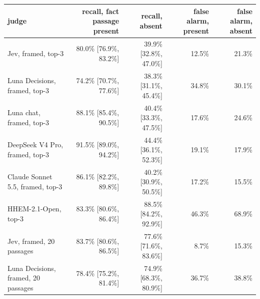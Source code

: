 \begin{tabular}{lrrrr}
\toprule
judge & recall, fact passage present & recall, absent & false alarm, present & false alarm, absent \\
\midrule
Jev, framed, top-3 & 80.0\% [76.9\%, 83.2\%] & 39.9\% [32.8\%, 47.0\%] & 12.5\% & 21.3\% \\
Luna Decisions, framed, top-3 & 74.2\% [70.7\%, 77.6\%] & 38.3\% [31.1\%, 45.4\%] & 34.8\% & 30.1\% \\
Luna chat, framed, top-3 & 88.1\% [85.4\%, 90.5\%] & 40.4\% [33.3\%, 47.5\%] & 17.6\% & 24.6\% \\
DeepSeek V4 Pro, framed, top-3 & 91.5\% [89.0\%, 94.2\%] & 44.4\% [36.1\%, 52.3\%] & 19.1\% & 17.9\% \\
Claude Sonnet 5.5, framed, top-3 & 86.1\% [82.2\%, 89.8\%] & 40.2\% [30.9\%, 50.5\%] & 17.2\% & 15.5\% \\
HHEM-2.1-Open, top-3 & 83.3\% [80.6\%, 86.4\%] & 88.5\% [84.2\%, 92.9\%] & 46.3\% & 68.9\% \\
Jev, framed, 20 passages & 83.7\% [80.6\%, 86.5\%] & 77.6\% [71.6\%, 83.6\%] & 8.7\% & 15.3\% \\
Luna Decisions, framed, 20 passages & 78.4\% [75.2\%, 81.4\%] & 74.9\% [68.3\%, 80.9\%] & 36.7\% & 38.8\% \\
\bottomrule
\end{tabular}

